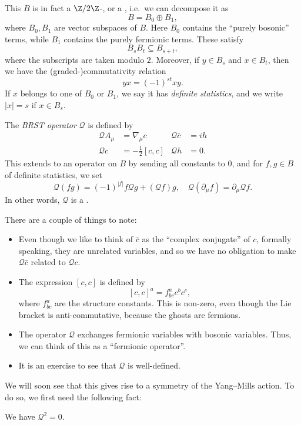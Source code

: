 \documentclass[a4paper]{article}
\begin{document}
This $B$ is in fact a $\Z/2\Z$-, or a , i.e.\ we can decompose it as
\[
  B = B_0 \oplus B_1,
\]
where $B_0, B_1$ are vector subspaces of $B$. Here $B_0$ contains the ``purely bosonic'' terms, while $B_1$ contains the purely fermionic terms. These satisfy
\[
  B_s B_t \subseteq B_{s + t},
\]
where the subscripts are taken modulo $2$. Moreover, if $y \in B_s$ and $x \in B_t$, then we have the (graded-)commutativity relation
\[
  yx = (-1)^{st} xy.
\]
If $x$ belongs to one of $B_0$ or $B_1$, we say it has \emph{definite statistics}, and we write $|x| = s$ if $x \in B_s$.

\begin{defi}
  The \emph{BRST operator} $\mathcal{Q}$ is defined by
  \begin{align*}
    \mathcal{Q} A_\mu &= \nabla_\mu c & \mathcal{Q} \bar{c} &= ih\\
    \mathcal{Q} c &= - \frac{1}{2}[c, c] & \mathcal{Q} h &= 0.
  \end{align*}
  This extends to an operator on $B$ by sending all constants to $0$, and for $f, g \in B$ of definite statistics, we set
  \[
    \mathcal{Q} (fg) = (-1)^{|f|} f \mathcal{Q} g + (\mathcal{Q} f) g,\quad \mathcal{Q} (\partial_\mu f) = \partial_\mu \mathcal{Q} f.
  \]
  In other words, $\mathcal{Q}$ is a .
\end{defi}
There are a couple of things to note:
\begin{itemize}
  \item Even though we like to think of $\bar{c}$ as the ``complex conjugate'' of $c$, formally speaking, they are unrelated variables, and so we have no obligation to make $\mathcal{Q} \bar{c}$ related to $\mathcal{Q} c$.
  \item The expression $[c, c]$ is defined by
    \[
      [c, c]^a = f_{bc}^a c^b c^c,
    \]
    where $f_{bc}^a$ are the structure constants. This is non-zero, even though the Lie bracket is anti-commutative, because the ghosts are fermions.
  \item The operator $\mathcal{Q}$ exchanges fermionic variables with bosonic variables. Thus, we can think of this as a ``fermionic operator''.
  \item It is an exercise to see that $\mathcal{Q}$ is well-defined.
\end{itemize}

We will soon see that this gives rise to a symmetry of the Yang--Mills action. To do so, we first need the following fact:
\begin{thm}
  We have $\mathcal{Q}^2 = 0$.
\end{thm}
\end{document}

